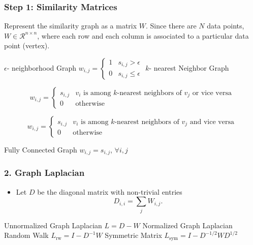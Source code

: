 \documentclass{beamer}
\begin{document}
\begin{frame}
\frametitle{Step 1: Similarity Matrices}
Represent the similarity graph as a matrix $W$. Since there are $N$ data points, $W \in \mathcal{R}^{n \times n}$, where each row and each column is associated to a particular data point (vertex).
\begin{outline}
    \1 $\epsilon$- neighborhood Graph
        $
        w_{i,j} = \begin{cases}
            1 & s_{i, j} > \epsilon \\
            0 & s_{i, j} \leq \epsilon
        \end{cases}
        $
    \1 $k$- nearest Neighbor Graph
        
            $$ w_{i,j} = \begin{cases}
            s_{i,j} & v_i \textrm{ is among }k\textrm{-nearest neighbors of } v_j \textrm{ or vice versa} \\
            0 & \textrm{otherwise}
                    \end{cases}$$
              
        $$w_{i,j} = \begin{cases}
            s_{i,j} & v_i \textrm{ is among }k\textrm{-nearest neighbors of } v_j \textrm{ and vice versa} \\
            0 & \textrm{otherwise}
        \end{cases}$$
        
    \1 Fully Connected Graph \qquad $w_{i,j} = s_{i, j}$, $\forall i,j$
\end{outline}
\end{frame}

\begin{frame}
\frametitle{2. Graph Laplacian}
\begin{itemize}
    \item Let $D$ be the diagonal matrix with non-trivial entries 
    $$
    D_{i, i} = \sum_{j} W_{i, j}.
    $$
\end{itemize}
\begin{outline}
 \1 Unnormalized Graph Laplacian
   \2 $L = D - W$
 \1 Normalized Graph Laplacian
     \2 Random Walk
        \3 $L_{\textrm{rw}} = I - D^{-1} W$
     \2  Symmetric Matrix
        \3 $L_{\textrm{sym}} = I -D^{-1/2}WD^{1/2}$
\end{outline}
\end{frame}
\end{document}
